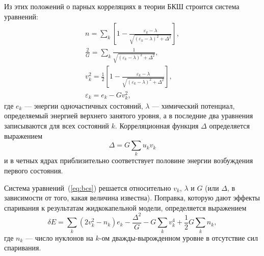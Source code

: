 Из этих положений о парных корреляциях в теории БКШ строится система уравнений:
\begin{equation}
\begin{gathered}
\displaystyle
n = \sum_k \left[ 1 - 
\frac{\varepsilon_k - \lambda}{\sqrt{(\varepsilon_k - \lambda)^2 + \Delta^2}} 
\right], \\
\frac{2}{G} = \sum_k \frac{1}{\sqrt{(\varepsilon_k - \lambda)^2 + \Delta^2}}, \\
v^2_k = \frac{1}{2} \left[ 1 - 
\frac{\varepsilon_k - \lambda}{\sqrt{(\varepsilon_k - \lambda)^2 + \Delta^2}} 
\right], \\
\varepsilon_k = e_k - G v_k^2,
\end{gathered}
\label{eq:bcs}
\end{equation}
где $e_k$ --- энергии одночастичных состояний, $\lambda$ --- химический потенциал, определяемый энергией верхнего занятого уровня, а в последние два уравнения записываются для всех состояний $k$. Корреляционная функция $\Delta$ определяется выражением 
\begin{equation}
\Delta = G \sum_k u_k v_k
\end{equation}
и в четных ядрах приблизительно соответствует половине энергии возбуждения первого состояния.

Система уравнений~(\ref{eq:bcs}) решается относительно $v_k$, $\lambda$ и $G$ (или $\Delta$, в зависимости от того, какая величина известна). Поправка, которую дают эффекты спаривания к результатам жидкокапельной модели, определяется выражением
\begin{equation}
\displaystyle
\delta E = \sum_k (2 v_k^2 - n_k)e_k - \frac{\Delta^2}{G} - G \sum_k v_k^4 +
\frac{1}{2} G \sum_k n_k,
\end{equation}
где $n_k$ --- число нуклонов на $k$-ом дважды-вырожденном уровне в отсутствие сил спаривания.



